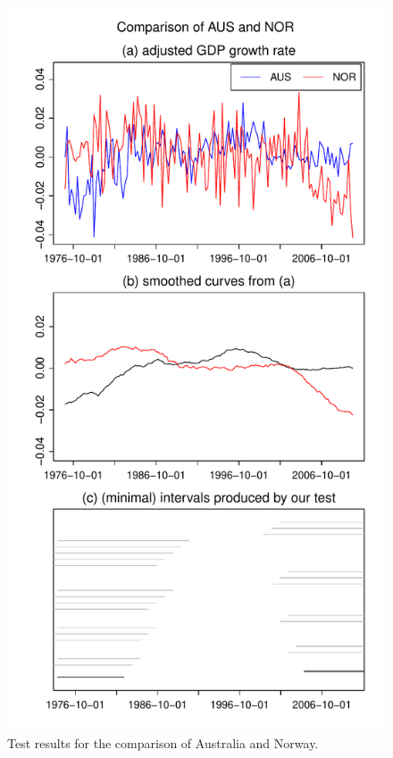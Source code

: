 \documentclass[a4paper,12pt]{article}
\begin{document}
\begin{figure}[b!]
\begin{minipage}[t]{0.49\textwidth}
\includegraphics[width=\textwidth]{output/plots/gdp/AUS_vs_NOR}
\caption{Test results for the comparison of Australia and Norway.}\label{fig:Australia:Norway}
\end{minipage}
\hspace{0.25cm}

\end{figure}
\end{document}
